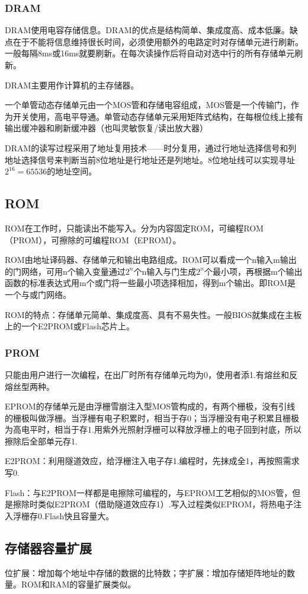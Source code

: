 \documentclass{ctexart}
\begin{document}
\subsubsection{DRAM}
DRAM使用电容存储信息。DRAM的优点是结构简单、集成度高、成本低廉。缺点在于不能将信息维持很长时间，必须使用额外的电路定时对存储单元进行刷新。一般每隔8ms或16ms就要刷新。在每次读操作后将自动对选中行的所有存储单元刷新。

DRAM主要用作计算机的主存储器。

一个单管动态存储单元由一个MOS管和存储电容组成，MOS管是一个传输门，作为开关使用，高电平导通。单管动态存储单元采用矩阵式结构，在每根位线上接有输出缓冲器和刷新缓冲器（也叫灵敏恢复/读出放大器）

DRAM的读写过程采用了地址复用技术——时分复用，通过行地址选择信号和列地址选择信号来判断当前8位地址是行地址还是列地址。8位地址线可以实现寻址$2^{16}=65536$的地址空间。
\subsection{ROM}
ROM在工作时，只能读出不能写入。分为内容固定ROM，可编程ROM（PROM），可擦除的可编程ROM（EPROM）。

ROM由地址译码器、存储单元和输出电路组成。ROM可以看成一个n输入m输出的门网络，可用n个输入变量通过$2^n$个n输入与门生成$2^n$个最小项，再根据m个输出函数的标准表达式用m个或门将一些最小项选择相加，得到m个输出。即ROM是一个与或门网络。

ROM的特点：存储单元简单、集成度高、具有不易失性。一般BIOS就集成在主板上的一个E2PROM或Flash芯片上。
\subsubsection{PROM}
只能由用户进行一次编程，在出厂时所有存储单元均为0，使用者添1.有熔丝和反熔丝型两种。

EPROM的存储单元是由浮栅雪崩注入型MOS管构成的，有两个栅极，没有引线的栅极叫做浮栅。当浮栅有电子积累时，相当于存0；当浮栅没有电子积累且栅极为高电平时，相当于存1.用紫外光照射浮栅可以释放浮栅上的电子回到衬底，所以擦除后全部单元存1.

E2PROM：利用隧道效应，给浮栅注入电子存1.编程时，先抹成全1，再按照需求写0.

Flash：与E2PROM一样都是电擦除可编程的，与EPROM工艺相似的MOS管，但是擦除时类似E2PROM（借助隧道效应存1）.写入过程类似EPROM，将热电子注入浮栅存0.Flash快且容量大。
\subsection{存储器容量扩展}
位扩展：增加每个地址中存储的数据的比特数；字扩展：增加存储矩阵地址的数量。ROM和RAM的容量扩展类似。
\end{document}
